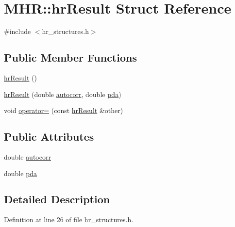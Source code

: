 \hypertarget{struct_m_h_r_1_1hr_result}{\section{M\+H\+R\+:\+:hr\+Result Struct Reference}
\label{struct_m_h_r_1_1hr_result}
}


{\ttfamily \#include $<$hr\+\_\+structures.\+h$>$}

\subsection*{Public Member Functions}
\begin{DoxyCompactItemize}
\item 
\hyperlink{struct_m_h_r_1_1hr_result_a94669db221b6a6834d0e385e144eb6ba}{hr\+Result} ()
\item 
\hyperlink{struct_m_h_r_1_1hr_result_a6aa4ad99d1212655782408fb3785eb1b}{hr\+Result} (double \hyperlink{struct_m_h_r_1_1hr_result_a369652948d5ff326dc1a822cbc0cc082}{autocorr}, double \hyperlink{struct_m_h_r_1_1hr_result_a7b5e354201327bd08c0ebded5c48367d}{pda})
\item 
void \hyperlink{struct_m_h_r_1_1hr_result_a31ede18d6971c0160729a5f8433e4928}{operator=} (const \hyperlink{struct_m_h_r_1_1hr_result}{hr\+Result} \&other)
\end{DoxyCompactItemize}
\subsection*{Public Attributes}
\begin{DoxyCompactItemize}
\item 
double \hyperlink{struct_m_h_r_1_1hr_result_a369652948d5ff326dc1a822cbc0cc082}{autocorr}
\item 
double \hyperlink{struct_m_h_r_1_1hr_result_a7b5e354201327bd08c0ebded5c48367d}{pda}
\end{DoxyCompactItemize}


\subsection{Detailed Description}


Definition at line 26 of file hr\+\_\+structures.\+h.



